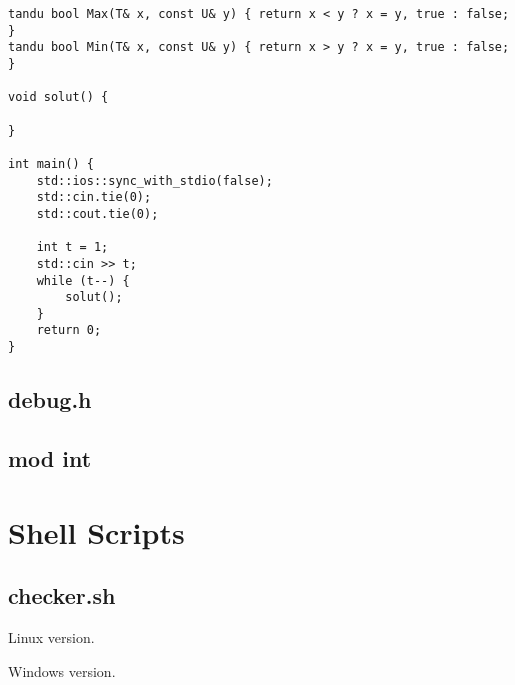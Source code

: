 \documentclass[UTF8, a4paper, titlepage, twoside]{ctexart}
\begin{document}
\begin{lstlisting}[style=cpp]
tandu bool Max(T& x, const U& y) { return x < y ? x = y, true : false; }
tandu bool Min(T& x, const U& y) { return x > y ? x = y, true : false; }

void solut() {
    
}

int main() {
    std::ios::sync_with_stdio(false);
    std::cin.tie(0);
    std::cout.tie(0);

    int t = 1;
    std::cin >> t;
    while (t--) {
        solut();
    }
    return 0;
}
\end{lstlisting}

\subsection{ debug.h }


\subsection { mod int }


\newpage
\section{ Shell Scripts }

\subsection{ checker.sh }

Linux version.


Windows version.

\end{document}
